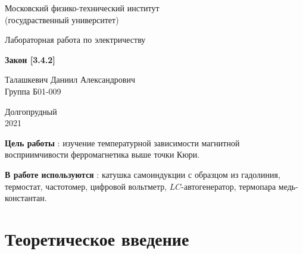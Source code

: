 \documentclass[a4paper, 12pt]{article}%
\begin{document}


\begin{titlepage}

	\newpage
	\begin{center}
		\normalsize Московский физико-технический институт \\(госудраственный 			университет)
	\end{center}

	\vspace{6em}

	\begin{center}
		\Large Лабораторная работа по электричеству\\
	\end{center}

	\vspace{1em}

	\begin{center}
		\large \textbf{Закон  [3.4.2]}
	\end{center}

	\vspace{2em}

	\begin{center}
		\large Талашкевич Даниил Александрович\\
		Группа Б01-009
	\end{center}

	\vspace{\fill}

	\begin{center}
	Долгопрудный \\2021
	\end{center}
	
\end{titlepage}



	\thispagestyle{empty}
	\newpage
	\tableofcontents
	\newpage
	\setcounter{page}{1}


					
\textbf{Цель работы} : изучение температурной зависимости магнитной восприимчивости ферромагнетика выше точки Кюри.

\textbf{В работе используются} : катушка самоиндукции с образцом из гадолиния, термостат, частотомер, цифровой вольтметр, $L C$-автогенератор, термопара медь-константан.
                    
\section{Теоретическое введение}
\end{document}
